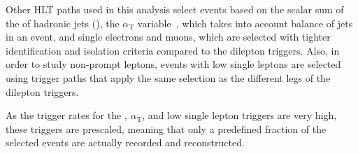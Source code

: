 Other HLT paths used in this analysis select events based on the scalar sum of the \pt of hadronic jets (\HT), the $\alpha_{\mathrm{T}}$ variable~\cite{Khachatryan2011196}, which takes into account balance of jets in an event, and single electrons and muons, which are selected with tighter identification and isolation criteria compared to the dilepton triggers. Also, in order to study non-prompt leptons, events with low \pt single leptons are selected using trigger paths that apply the same selection as the different legs of the dilepton triggers.  

As the trigger rates for the \HT, $\alpha_{\mathrm{T}}$, and low \pt single lepton triggers are very high, these triggers are prescaled, meaning that only a predefined fraction of the selected events are actually recorded and reconstructed.

  


